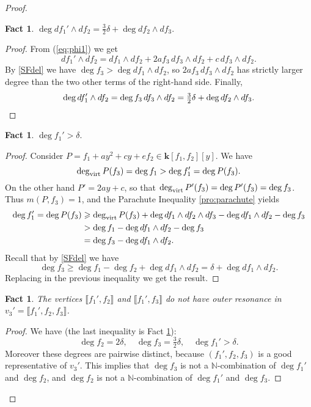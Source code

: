 \documentclass[reqno,oneside,11pt]{amsart}
\theoremstyle{plain}
\newtheorem{fact}[theorem]{Fact}
\theoremstyle{definition}
\newcommand{\N}{\mathbb{N}}
\newcommand{\K}{\mathbf{k}}
\newcommand{\dvirt}{\deg_{\text{\rm virt}}}
\newcommand{\llb}{\llbracket}
\newcommand{\rrb}{\rrbracket}
\renewcommand{\ge}{\geqslant}
\begin{document}
\begin{proof}
\begin{fact}
\label{fact:df1' df2}
$\deg df_1' \wedge df_2 = \frac{3}{2}\delta + \deg df_2 \wedge df_3.$
\end{fact}

\begin{proof}
From (\ref{eq:phi1}) we get
$$df_1' \wedge df_2 = df_1 \wedge df_2 + 2af_3\, df_3\wedge df_2 + c\, df_3 \wedge df_2.$$
By \ref{SFdel} we have $\deg f_3 > \deg df_1 \wedge df_2$, so $2af_3\, df_3\wedge df_2$ has strictly larger degree than the two other terms of the right-hand side.
Finally,
\begin{equation*}
\deg df_1' \wedge df_2 = \deg f_3\,df_3\wedge df_2 = \tfrac{3}{2}\delta + \deg df_2 \wedge df_3. \qedhere
\end{equation*}
\end{proof}

\begin{fact}
\label{fact:deg f1'}
$\deg f_1' > \delta.$
\end{fact}

\begin{proof}
Consider $P =  f_1 + a y^2 + c y + ef_2 \in \K[f_1,f_2][y]$.
We have
$$\dvirt P(f_3) = \deg f_1 > \deg f_1' = \deg P(f_3).$$
On the other hand $P' = 2ay + c$, so that $\dvirt P'(f_3) =\deg P'(f_3) =  \deg f_3$.
Thus $m(P,f_3) = 1$, and the Parachute Inequality \ref{pro:parachute} yields
\begin{align*}
\deg f_1' = \deg P(f_3) &\ge \dvirt P(f_3) + \deg df_1 \wedge df_2 \wedge df_3 - \deg df_1 \wedge df_2 - \deg f_3\\
            &> \deg f_1  - \deg df_1 \wedge df_2 - \deg f_3\\
            &= \deg f_3  - \deg df_1 \wedge df_2.
\end{align*}
Recall that by \ref{SFdel} we have
$$ \deg f_3 \ge \deg f_1 - \deg f_2  + \deg df_1 \wedge df_2 = \delta + \deg df_1 \wedge df_2.$$
Replacing in the previous inequality we get the result.
\end{proof}

\begin{fact}
\label{fact:non resonant}
The vertices $\llb f_1', f_2 \rrb$ and $\llb f_1', f_3 \rrb$ do not have outer resonance in $v_3' = \llb f_1', f_2, f_3 \rrb$.
\end{fact}

\begin{proof}
We have (the last inequality is Fact \ref{fact:deg f1'}):
$$\deg f_2 = 2\delta, \quad \deg f_3 = \tfrac32 \delta, \quad \deg f_1' >
\delta.$$
Moreover these degrees are pairwise distinct, because $(f_1', f_2, f_3)$ is a
good representative of $v_3'$.
This implies that $\deg f_3$ is not a $\N$-combination of $\deg f_1'$ and $\deg
f_2$, and $\deg f_2$  is not a $\N$-combination of $\deg f_1'$ and $\deg f_3$.
\end{proof}


\end{proof}
\end{document}
